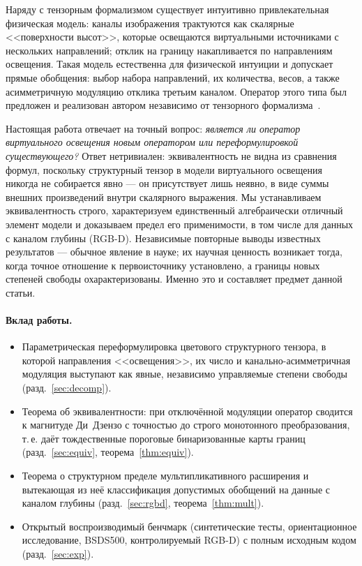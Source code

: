 \documentclass[11pt,a4paper]{article}
\theoremstyle{plain}
\theoremstyle{definition}
\theoremstyle{remark}
\begin{document}
Наряду с тензорным формализмом существует интуитивно привлекательная
физическая модель: каналы изображения трактуются как скалярные <<поверхности
высот>>, которые освещаются виртуальными источниками с нескольких
направлений; отклик на границу накапливается по направлениям освещения.
Такая модель естественна для физической интуиции и допускает прямые
обобщения: выбор набора направлений, их количества, весов, а также
асимметричную модуляцию отклика третьим каналом. Оператор этого типа был
предложен и реализован автором независимо от тензорного
формализма~\cite{panchenko2026}.

Настоящая работа отвечает на точный вопрос: \emph{является ли оператор
виртуального освещения новым оператором или переформулировкой
существующего?} Ответ нетривиален: эквивалентность не видна из сравнения
формул, поскольку структурный тензор в модели виртуального освещения
никогда не собирается явно --- он присутствует лишь неявно, в виде суммы
внешних произведений внутри скалярного выражения. Мы устанавливаем
эквивалентность строго, характеризуем единственный алгебраически отличный
элемент модели и доказываем предел его применимости, в том числе для
данных с каналом глубины (RGB-D). Независимые повторные
выводы известных результатов --- обычное явление в науке; их научная
ценность возникает тогда, когда точное отношение к первоисточнику
установлено, а границы новых степеней свободы охарактеризованы. Именно это
и составляет предмет данной статьи.

\paragraph{Вклад работы.}
\begin{itemize}
  \item Параметрическая переформулировка цветового структурного тензора, в
        которой направления <<освещения>>, их число и канально-асимметричная
        модуляция выступают как явные, независимо управляемые степени
        свободы (разд.~\ref{sec:decomp}).
  \item Теорема об эквивалентности: при отключённой модуляции оператор
        сводится к магнитуде Ди~Дзензо с точностью до строго монотонного
        преобразования, т.\,е. даёт тождественные пороговые бинаризованные
        карты границ (разд.~\ref{sec:equiv}, теорема~\ref{thm:equiv}).
  \item Теорема о структурном пределе мультипликативного расширения и
        вытекающая из неё классификация допустимых обобщений на данные
        с каналом глубины (разд.~\ref{sec:rgbd}, теорема~\ref{thm:mult}).
  \item Открытый воспроизводимый бенчмарк (синтетические тесты,
        ориентационное исследование, BSDS500, контролируемый RGB-D)
        с полным исходным кодом (разд.~\ref{sec:exp}).
\end{itemize}
\end{document}
